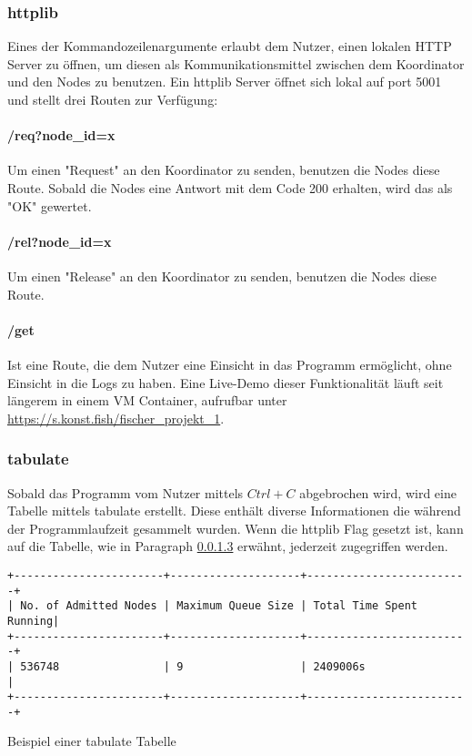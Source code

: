 \documentclass[12pt, letterpaper]{article}
\newenvironment{code}{\captionsetup{type=listing}}{}
\begin{document}
\subsubsection{httplib}
\label{httplib_ref}
Eines der Kommandozeilenargumente erlaubt dem Nutzer, einen lokalen HTTP Server zu öffnen, um diesen als Kommunikationsmittel zwischen dem Koordinator und den Nodes zu benutzen.
Ein httplib\cite{httplib-ref} Server öffnet sich lokal auf port 5001 und stellt drei Routen zur Verfügung:

\paragraph{/req?node\_id=x}
Um einen "Request" an den Koordinator zu senden, benutzen die Nodes diese Route. Sobald die Nodes eine Antwort mit dem Code 200 erhalten, wird das als "OK" gewertet.

\paragraph{/rel?node\_id=x}
Um einen "Release" an den Koordinator zu senden, benutzen die Nodes diese Route.

\paragraph{/get}
\label{get_ref}
Ist eine Route, die dem Nutzer eine Einsicht in das Programm ermöglicht, ohne Einsicht in die Logs zu haben. Eine Live-Demo dieser Funktionalität läuft seit längerem in einem VM Container, aufrufbar unter \url{https://s.konst.fish/fischer_projekt_1}.

\subsubsection{tabulate}
Sobald das Programm vom Nutzer mittels $Ctrl+C$ abgebrochen wird, wird eine Tabelle mittels tabulate\cite{tabulate-ref} erstellt. Diese enthält diverse Informationen die während der Programmlaufzeit gesammelt wurden.
Wenn die httplib Flag gesetzt ist, kann auf die Tabelle, wie in Paragraph \ref{get_ref} erwähnt, jederzeit zugegriffen werden.

\begin{code}
\begin{verbatim}
+-----------------------+--------------------+-------------------------+
| No. of Admitted Nodes | Maximum Queue Size | Total Time Spent Running|
+-----------------------+--------------------+-------------------------+
| 536748                | 9                  | 2409006s                |
+-----------------------+--------------------+-------------------------+
\end{verbatim}
\caption{Beispiel einer tabulate Tabelle}
\end{code}
\end{document}
